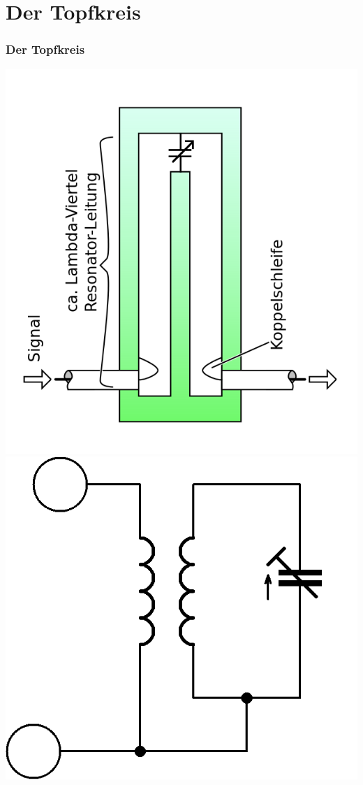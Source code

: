 \section*{Der Topfkreis}
\begin{frame}
\frametitle{Der Topfkreis}
\begin{center}
\includegraphics[scale=0.2]{a10/Topfkreis.png}
\hspace{2mm}
\includegraphics[scale=0.8]{a10/Topfkreis-ESB.png}\\

\end{center}
\end{frame}
